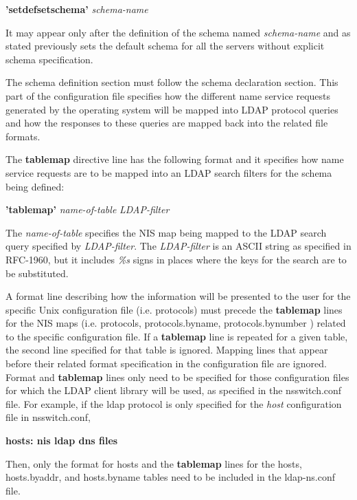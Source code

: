 \begin{center}
{\bf 'setdefsetschema'} {\em schema-name}
\end{center}

It may appear only after the definition of the schema named
{\em schema-name} and as stated previously sets the default schema for
all the servers without explicit schema specification.

The schema definition section must follow the schema declaration
section. This part of the configuration file specifies how the
different name service requests generated by the operating system will
be mapped into LDAP protocol queries and how the responses to these
queries are mapped back into the related file formats.

The {\bf tablemap} directive line has the following format and it
specifies how name service requests are to be mapped into an LDAP
search filters for the schema being defined:

\begin{center}
{\bf 'tablemap'} {\em name-of-table} {\em LDAP-filter}
\end{center}

The {\em name-of-table} specifies the NIS map being mapped to the LDAP
search query specified by {\em LDAP-filter}. The {\em LDAP-filter} is
an ASCII string as specified in RFC-1960, but it includes {\em \%s}
signs in places where the keys for the search are to be substituted. 

A format line describing how the information will be presented to the
user for the specific Unix configuration file (i.e. protocols) must precede
the {\bf tablemap} lines for the NIS maps  (i.e. protocols, protocols.byname,
protocols.bynumber ) related to the specific configuration file.
If a {\bf tablemap} line is repeated for a given table, the second line
specified for that table is ignored. Mapping lines that appear before
their related format specification in the configuration file are ignored.
Format and {\bf tablemap} lines only need to be specified for those
configuration files for which the LDAP client library will be used, as
specified in the nsswitch.conf file. For example, if the ldap protocol
is only specified for the {\em host} configuration file in nsswitch.conf, 

\begin{center}
{\bf hosts:                  nis ldap dns files}
\end{center}


Then, only the format for hosts and the {\bf tablemap} lines for the hosts,
hosts.byaddr, and hosts.byname tables  need to be included in the
ldap-ns.conf file.


